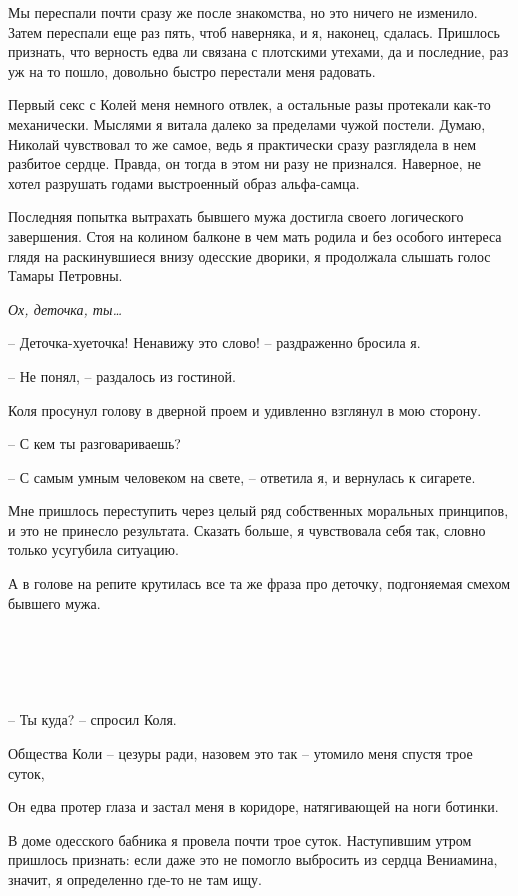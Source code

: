 \documentclass[
]{book}
\begin{document}
Мы переспали почти сразу же после знакомства, но это ничего не изменило. Затем переспали еще раз пять, чтоб наверняка, и я, наконец, сдалась. Пришлось признать, что верность едва ли связана с плотскими утехами, да и последние, раз уж на то пошло, довольно быстро перестали меня радовать.

Первый секс с Колей меня немного отвлек, а остальные разы протекали как-то механически. Мыслями я витала далеко за пределами чужой постели. Думаю, Николай чувствовал то же самое, ведь я практически сразу разглядела в нем разбитое сердце. Правда, он тогда в этом ни разу не признался. Наверное, не хотел разрушать годами выстроенный образ альфа-самца.

Последняя попытка вытрахать бывшего мужа достигла своего логического завершения. Стоя на колином балконе в чем мать родила и без особого интереса глядя на раскинувшиеся внизу одесские дворики, я продолжала слышать голос Тамары Петровны.

\emph{Ох, деточка, ты\ldots{}}

-- Деточка-хуеточка! Ненавижу это слово! -- раздраженно бросила я.

-- Не понял, -- раздалось из гостиной.

Коля просунул голову в дверной проем и удивленно взглянул в мою сторону.

-- С кем ты разговариваешь?

-- С самым умным человеком на свете, -- ответила я, и вернулась к сигарете.

Мне пришлось переступить через целый ряд собственных моральных принципов, и это не принесло результата. Сказать больше, я чувствовала себя так, словно только усугубила ситуацию.

А в голове на репите крутилась все та же фраза про деточку, подгоняемая смехом бывшего мужа.

\hypertarget{chapter-97}{%
\chapter{~}\label{chapter-97}}

-- Ты куда? -- спросил Коля.

Общества Коли -- цезуры ради, назовем это так -- утомило меня спустя трое суток,

Он едва протер глаза и застал меня в коридоре, натягивающей на ноги ботинки.

В доме одесского бабника я провела почти трое суток. Наступившим утром пришлось признать: если даже это не помогло выбросить из сердца Вениамина, значит, я определенно где-то не там ищу.
\end{document}
